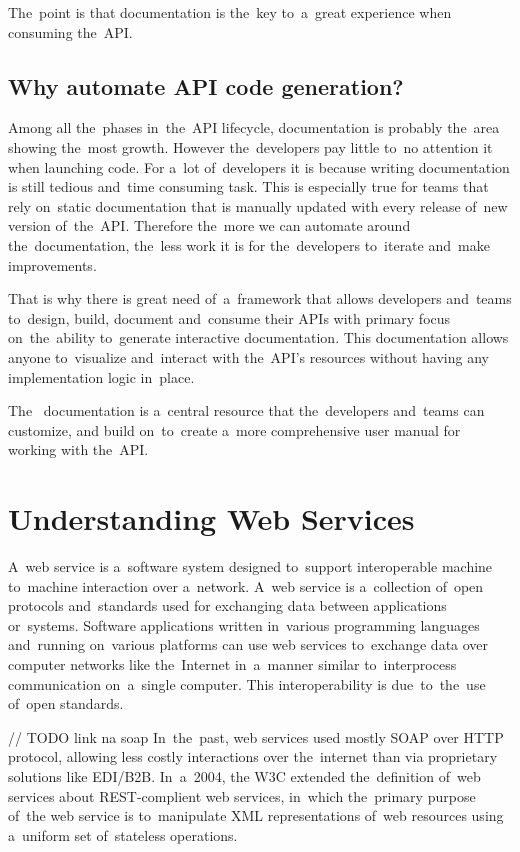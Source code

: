 The~point is that documentation is the~key to~a~great experience when consuming
the~API.


\subsection{Why automate API code generation?}
Among all the~phases in~the~API lifecycle, documentation is probably the~area
showing the~most growth. However the~developers pay little to~no attention it
when launching code. For a~lot of~developers it is because writing documentation
is still tedious and~time consuming task. This is especially true for teams that
rely on~static documentation that is manually updated with every release of~new
version of~the~API. Therefore the~more we can automate around the~documentation,
the~less work it is for the~developers to~iterate and~make improvements.

That is why there is great need of~a~framework that allows developers and~teams
to~design, build, document and~consume their APIs with primary focus
on~the~ability to~generate interactive documentation. This documentation allows
anyone to~visualize and~interact with the~API's resources without having any
implementation logic in~place.

The~ documentation is a~central resource that the~developers
and~teams can customize, and build on~to~create a~more comprehensive user manual
for working with the~API.

\section{Understanding Web Services}
A~web service is a~software system designed to~support interoperable machine
to~machine interaction over a~network.
A~web service is a~collection of~open protocols and~standards used for
exchanging data between applications or~systems. Software
applications written in~various programming languages and~running on~various
platforms can use web services to~exchange data over computer networks like
the~Internet in~a~manner similar to~interprocess communication on~a~single
computer. This interoperability is due~to~the~use of~open standards. 

// TODO link na soap
In~the~past, web services used mostly SOAP over HTTP protocol, allowing less
costly interactions over the~internet than via proprietary solutions like
EDI/B2B. In~a~2004, the W3C extended the~definition of~web services about
REST-complient web services, in~which the~primary purpose of~the web service is
to~manipulate XML representations of~web resources using a~uniform set
of~stateless operations.


